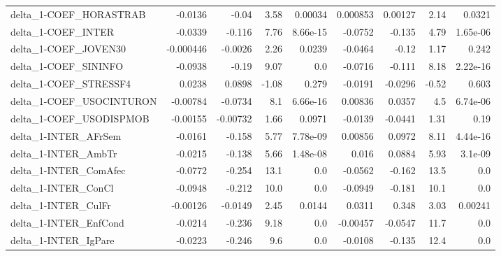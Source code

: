 \begin{tabular}{lrrrrrrrr}
delta\_1-COEF\_HORASTRAB                 &     -0.0136 &        -0.04 &    3.58 &  0.00034 &   0.000853 &     0.00127 &         2.14 &        0.0321 \\
delta\_1-COEF\_INTER                     &     -0.0339 &       -0.116 &    7.76 & 8.66e-15 &    -0.0752 &      -0.135 &         4.79 &      1.65e-06 \\
delta\_1-COEF\_JOVEN30                   &   -0.000446 &      -0.0026 &    2.26 &   0.0239 &    -0.0464 &       -0.12 &         1.17 &         0.242 \\
delta\_1-COEF\_SININFO                   &     -0.0938 &        -0.19 &    9.07 &      0.0 &    -0.0716 &      -0.111 &         8.18 &      2.22e-16 \\
delta\_1-COEF\_STRESSF4                  &      0.0238 &       0.0898 &   -1.08 &    0.279 &    -0.0191 &     -0.0296 &        -0.52 &         0.603 \\
delta\_1-COEF\_USOCINTURON               &    -0.00784 &      -0.0734 &     8.1 & 6.66e-16 &    0.00836 &      0.0357 &          4.5 &      6.74e-06 \\
delta\_1-COEF\_USODISPMOB                &    -0.00155 &     -0.00732 &    1.66 &   0.0971 &    -0.0139 &     -0.0441 &         1.31 &          0.19 \\
delta\_1-INTER\_AFrSem                   &     -0.0161 &       -0.158 &    5.77 & 7.78e-09 &    0.00856 &      0.0972 &         8.11 &      4.44e-16 \\
delta\_1-INTER\_AmbTr                    &     -0.0215 &       -0.138 &    5.66 & 1.48e-08 &      0.016 &      0.0884 &         5.93 &       3.1e-09 \\
delta\_1-INTER\_ComAfec                  &     -0.0772 &       -0.254 &    13.1 &      0.0 &    -0.0562 &      -0.162 &         13.5 &           0.0 \\
delta\_1-INTER\_ConCl                    &     -0.0948 &       -0.212 &    10.0 &      0.0 &    -0.0949 &      -0.181 &         10.1 &           0.0 \\
delta\_1-INTER\_CulFr                    &    -0.00126 &      -0.0149 &    2.45 &   0.0144 &     0.0311 &       0.348 &         3.03 &       0.00241 \\
delta\_1-INTER\_EnfCond                  &     -0.0214 &       -0.236 &    9.18 &      0.0 &   -0.00457 &     -0.0547 &         11.7 &           0.0 \\
delta\_1-INTER\_IgPare                   &     -0.0223 &       -0.246 &     9.6 &      0.0 &    -0.0108 &      -0.135 &         12.4 &           0.0 \\

\end{tabular}
